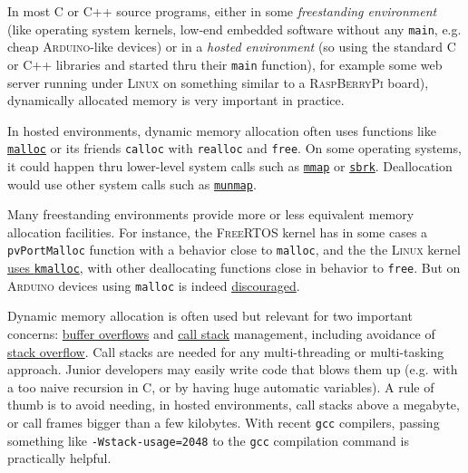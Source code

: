  \medskip

 In most C or C++ source programs, either in some \emph{freestanding
   environment} (like operating system kernels, low-end embedded
 software without any \texttt{main}, e.g. cheap
  \textsc{Arduino}-like
 devices) or in a \emph{hosted environment} (so using the standard C
 or C++ libraries and started thru their \texttt{main} function), for
 example some web server running under \textsc{Linux} on something
 similar to a 
 \textsc{RaspBerryPi} board), dynamically allocated memory is very
   important in practice.

 In hosted environments, dynamic memory allocation often uses
 functions like
 \href{https://man7.org/linux/man-pages/man3/malloc.3.html}{\texttt{malloc}}
 or its friends \texttt{calloc} with \texttt{realloc} and
 \texttt{free}. On some operating systems, it could happen thru
 lower-level system calls such as
 \href{https://man7.org/linux/man-pages/man2/mmap.2.html}{\texttt{mmap}}
 or
 \href{https://man7.org/linux/man-pages/man2/sbrk.2.html}{\texttt{sbrk}}. Deallocation
 would use other system calls such as
 \href{https://man7.org/linux/man-pages/man2/munmap.2.html}{\texttt{munmap}}.

 Many freestanding environments provide more or less equivalent memory
 allocation facilities. For instance,
  the \textsc{FreeRTOS}
 kernel has in some cases a \texttt{pvPortMalloc} function with a
 behavior close to \texttt{malloc}, and the
  the \textsc{Linux} kernel
 \href{http://www.jikos.cz/jikos/Kmalloc_Internals.html}{uses
   \texttt{kmalloc}}, with other deallocating functions close in
 behavior to \texttt{free}. But on  \textsc{Arduino} devices using \texttt{malloc} is indeed
 \href{https://arduino.stackexchange.com/q/682/12068}{discouraged}.

 Dynamic memory allocation is often used but relevant for two
 important concerns:  
 \href{https://en.wikipedia.org/wiki/Buffer_overflow}{buffer
   overflows} and \href{https://en.wikipedia.org/wiki/Call_stack}{call
   stack} management, including avoidance of
 \href{https://en.wikipedia.org/wiki/Stack_overflow}{stack
   overflow}. Call stacks are needed for any multi-threading or
 multi-tasking approach. Junior developers may easily write code that
 blows them up (e.g. with a too naive recursion in C, or by having
 huge automatic variables). A rule of thumb is to avoid needing, in
 hosted environments, call stacks above a megabyte, or call frames
 bigger than a few kilobytes. With recent \texttt{gcc} compilers,
  passing
 something like \texttt{-Wstack-usage=2048} to the \texttt{gcc}
 compilation command is practically helpful.

